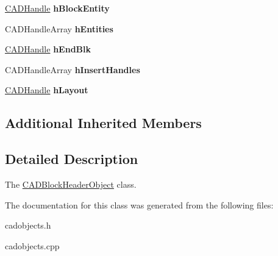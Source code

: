 \begin{DoxyCompactItemize}
\item 
\hyperlink{class_c_a_d_handle}{C\+A\+D\+Handle} {\bfseries h\+Block\+Entity}\hypertarget{class_c_a_d_block_header_object_a09c06a22ef8458f598f918b3ce6632e1}{}\label{class_c_a_d_block_header_object_a09c06a22ef8458f598f918b3ce6632e1}

\item 
C\+A\+D\+Handle\+Array {\bfseries h\+Entities}\hypertarget{class_c_a_d_block_header_object_a7e8666b92197387f5ad156474fc4cbb1}{}\label{class_c_a_d_block_header_object_a7e8666b92197387f5ad156474fc4cbb1}

\item 
\hyperlink{class_c_a_d_handle}{C\+A\+D\+Handle} {\bfseries h\+End\+Blk}\hypertarget{class_c_a_d_block_header_object_a9cbfde2769de87ef3ff88211e2e659fa}{}\label{class_c_a_d_block_header_object_a9cbfde2769de87ef3ff88211e2e659fa}

\item 
C\+A\+D\+Handle\+Array {\bfseries h\+Insert\+Handles}\hypertarget{class_c_a_d_block_header_object_a0a59dfdeb80a70686e9e36e10f5fdeb1}{}\label{class_c_a_d_block_header_object_a0a59dfdeb80a70686e9e36e10f5fdeb1}

\item 
\hyperlink{class_c_a_d_handle}{C\+A\+D\+Handle} {\bfseries h\+Layout}\hypertarget{class_c_a_d_block_header_object_a75756e2244e591dfd3c671c80929dae5}{}\label{class_c_a_d_block_header_object_a75756e2244e591dfd3c671c80929dae5}

\end{DoxyCompactItemize}
\subsection*{Additional Inherited Members}


\subsection{Detailed Description}
The \hyperlink{class_c_a_d_block_header_object}{C\+A\+D\+Block\+Header\+Object} class. 

The documentation for this class was generated from the following files\+:\begin{DoxyCompactItemize}
\item 
cadobjects.\+h\item 
cadobjects.\+cpp\end{DoxyCompactItemize}
